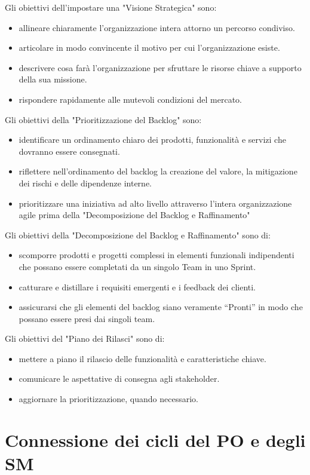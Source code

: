 \documentclass[12pt,a4paper,parskip=full]{scrartcl}
\begin{document}
Gli obiettivi dell'impostare una "Visione Strategica" sono:
\begin{itemize}
\item allineare chiaramente l'organizzazione intera attorno un percorso condiviso.
\item articolare in modo convincente il motivo per cui l'organizzazione esiste.
\item descrivere cosa farà l'organizzazione per sfruttare le risorse chiave a supporto della sua missione.
\item rispondere rapidamente alle mutevoli condizioni del mercato.
\end{itemize}
Gli obiettivi della "Prioritizzazione del Backlog" sono:
\begin{itemize}
\item identificare un ordinamento chiaro dei prodotti, funzionalità e servizi che dovranno essere consegnati.
\item riflettere nell'ordinamento del backlog la creazione del valore, la mitigazione dei rischi e delle dipendenze interne.
\item prioritizzare una iniziativa ad alto livello attraverso l'intera organizzazione agile prima della "Decomposizione del Backlog e Raffinamento"
\end{itemize}
Gli obiettivi della "Decomposizione del Backlog e Raffinamento" sono di:
\begin{itemize}
\item scomporre prodotti e progetti complessi in elementi funzionali indipendenti che possano essere completati da un singolo Team in uno Sprint.
\item catturare e distillare i requisiti emergenti e i feedback dei clienti.
\item assicurarsi che gli elementi del backlog siano veramente ``Pronti'' in modo che possano essere presi dai singoli team.
\end{itemize}
Gli obiettivi del "Piano dei Rilasci" sono di:
\begin{itemize}
\item mettere a piano il rilascio delle funzionalità e caratteristiche chiave.
\item comunicare le aspettative di consegna agli stakeholder.
\item aggiornare la prioritizzazione, quando necessario.
\end{itemize}

\section{Connessione dei cicli del PO e degli SM}
\end{document}
